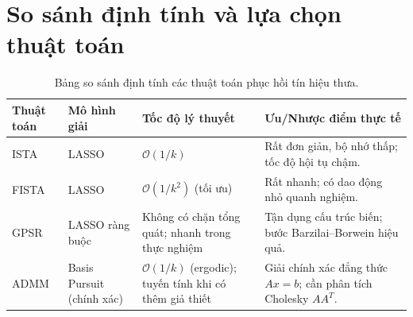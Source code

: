 \section{So sánh định tính và lựa chọn thuật toán}
\begin{table}[htbp]
\centering
\caption{Bảng so sánh định tính các thuật toán phục hồi tín hiệu thưa.}
\label{tab:algorithm_comparison}
\begin{tabular}{lp{3.5cm}p{4cm}p{4cm}}
\toprule
\textbf{Thuật toán} & \textbf{Mô hình giải} & \textbf{Tốc độ lý thuyết} & \textbf{Ưu/Nhược điểm thực tế} \\
\midrule
ISTA & LASSO & $\mathcal{O}(1/k)$ & Rất đơn giản, bộ nhớ thấp; tốc độ hội tụ chậm. \\
FISTA & LASSO & $\mathcal{O}(1/k^2)$ (tối ưu) & Rất nhanh; có dao động nhỏ quanh nghiệm. \\
GPSR & LASSO ràng buộc & Không có chặn tổng quát; nhanh trong thực nghiệm & Tận dụng cấu trúc biến; bước Barzilai--Borwein hiệu quả. \\
ADMM & Basis Pursuit (chính xác) & $\mathcal{O}(1/k)$ (ergodic); tuyến tính khi có thêm giả thiết & Giải chính xác đẳng thức $Ax = b$; cần phân tích Cholesky $AA^T$. \\
\bottomrule
\end{tabular}
\end{table}
